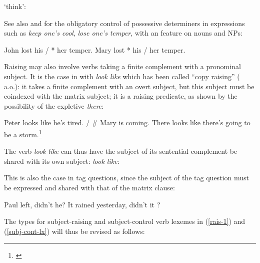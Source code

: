 \documentclass[output=paper
	        ,collection
	        ,collectionchapter
 	        ,biblatex
                ,babelshorthands
                ,newtxmath
                ,draftmode
                ,colorlinks, citecolor=brown
]{langscibook}
\begin{document}
\begin{exe}
\ex {} `think':\\
\end{exe}

 See also  and  for the obligatory control of possessive determiners in  expressions such as \emph{keep one's cool}, \emph{lose one's temper}, with an \xarg feature on nouns and NPs:
\begin{exe}
\ex \begin{xlist}
\ex John lost his / * her temper.
\ex Mary lost * his / her temper.
\end{xlist}
\end{exe}

Raising may also involve verbs taking a finite complement with a pronominal subject. It is the case in  with \emph{look like} which has been called ``copy raising'' (\citealp{Rogers74a-u,Hornstein99a-u} a.o.): it takes a finite complement with an overt subject, but this subject must be coindexed with the matrix subject; it is a raising predicate, as shown by the possibility of the expletive \emph{there}:

\eal
\ex Peter looks like he's tired. / \# Mary is coming.
\ex There looks like there's going to be a storm.\footnote{
\citet[]{Sag2007a}
}
\zl

The verb \emph{look like} can thus have the subject of its sentential complement  be shared with its
own subject:
\ea
\emph{look like}:\\
\avmtmp{
[ \argst < \1, S[xarg & \1] > ]}
\z

This is also the case in  tag questions, since the subject of the tag question must be expressed and shared with that of the matrix clause: 

\eal
\ex Paul left, didn't he?
\ex It rained yesterday, didn't it ?
\zl


The types for subject-raising and subject-control verb lexemes in (\ref{rais-1}) and (\ref{subj-cont-lx}) will thus be revised as follows:\\
\eal
\ex {}  \impl \avmtmp{ [\argst \1 \+ < [x-arg & \1 ] > ] } 
\ex {} \impl {}
\zl
\end{document}
